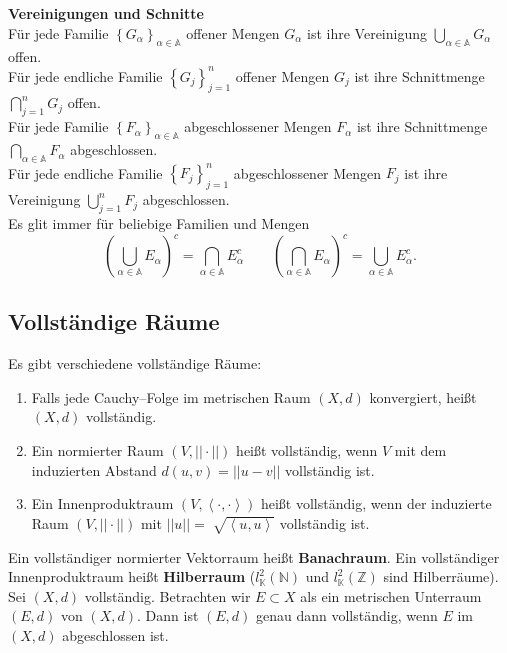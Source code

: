 \documentclass[a4paper,12pt]{article}
\begin{document}
\\\hfill\\\textbf{Vereinigungen und Schnitte}\\ 
Für jede Familie $\left\{G_\alpha \right\}_{\alpha  \in \mathbb{A}}$ offener Mengen $G_\alpha $ ist ihre Vereinigung $\bigcup_{\alpha  \in \mathbb{A}}G_\alpha $ offen.\\
Für jede endliche Familie $\left\{G_j\right\}_{j=1}^n$ offener Mengen $G_j$ ist ihre Schnittmenge $\bigcap_{j=1}^nG_j$ offen.\\
Für jede Familie $\left\{F_\alpha \right\}_{\alpha  \in \mathbb{A}}$ abgeschlossener Mengen $F_\alpha $ ist ihre Schnittmenge $\bigcap_{\alpha  \in \mathbb{A}}F_\alpha $ abgeschlossen.\\
Für jede endliche Familie $\left\{F_j\right\}_{j=1}^n$ abgeschlossener Mengen $F_j$ ist ihre Vereinigung $\bigcup_{j=1}^nF_j$ abgeschlossen.\\
Es glit immer für beliebige Familien und Mengen
\[ 
        \left(\bigcup_{\alpha  \in \mathbb{A}}E_\alpha \right)^c=\bigcap_{\alpha  \in \mathbb{A}}E_{\alpha }^c\qquad \left(\bigcap_{\alpha  \in \mathbb{A}}E_\alpha \right)^c=\bigcup_{\alpha  \in \mathbb{A}}E_\alpha ^c
.\] 


\subsection{Vollständige Räume}
Es gibt verschiedene vollständige Räume:
\begin{enumerate}[label=(\alph*)]
        \item Falls jede Cauchy--Folge im metrischen Raum $\left(X,d\right)$ konvergiert, heißt $\left(X,d\right)$ vollständig.
        \item Ein normierter Raum $\left(V,||\cdot || \right)$ heißt vollständig, wenn $V$ mit dem induzierten Abstand $d\left(u,v\right)=||u-v|| $ vollständig ist.
        \item Ein Innenproduktraum $\left(V,\left\langle \cdot ,\cdot \right\rangle \right)$ heißt vollständig, wenn der induzierte Raum $\left(V,||\cdot || \right)$ mit $||u||=\sqrt[ ]{\left\langle u,u\right\rangle }$ vollständig ist.
\end{enumerate}
Ein vollständiger normierter Vektorraum heißt \textbf{Banachraum}. Ein vollständiger Innenproduktraum heißt \textbf{Hilberraum} ($l^2_\mathbb{K}\left(\mathbb{N}\right)$ und $l^2_\mathbb{K}\left(\mathbb{Z}\right)$ sind Hilberräume).\\\noindent
Sei $(X,d)$ vollständig. Betrachten wir $E\subset X$ als ein metrischen Unterraum $(E,d)$ von $(X,d)$. Dann ist $(E,d)$ genau dann vollständig, wenn $E$ im $(X,d)$ abgeschlossen ist. 
\end{document}
